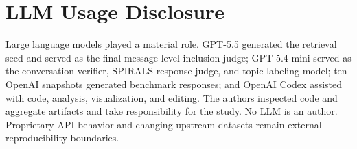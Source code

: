 \documentclass{article}
\begin{document}
\section{LLM Usage Disclosure}

Large language models played a material role. GPT-5.5 generated the retrieval seed and served as the final message-level inclusion judge; GPT-5.4-mini served as the conversation verifier, SPIRALS response judge, and topic-labeling model; ten OpenAI snapshots generated benchmark responses; and OpenAI Codex assisted with code, analysis, visualization, and editing. The authors inspected code and aggregate artifacts and take responsibility for the study. No LLM is an author. Proprietary API behavior and changing upstream datasets remain external reproducibility boundaries.
\end{document}
